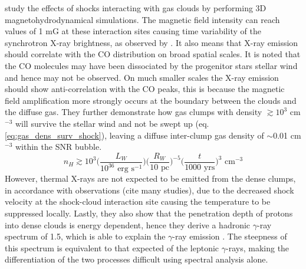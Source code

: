 \documentclass[12pt,a4paper]{article}
\begin{document}
\cite{2012ApJ...744...71I} study the effects of shocks interacting with gas clouds by performing 3D magnetohydrodynamical simulations. The magnetic field intensity can reach values of 1 mG at these interaction sites causing time variability of the synchrotron X-ray brightness, as observed by \cite{2007Natur.449..576U}. It also means that X-ray emission should correlate with the CO distribution on broad spatial scales. It is noted that the CO molecules may have been dissociated by the progenitor stars stellar wind and hence may not be observed. On much smaller scales the X-ray emission should show anti-correlation with the CO peaks, this is because the magnetic field amplification more strongly occurs at the boundary between the clouds and the diffuse gas. They further demonstrate how gas clumps with density $\gtrsim 10^3$ cm$^{-3}$ will survive the stellar wind and not be swept up (eq. \ref{eq:gas_dens_surv_shock}), leaving a diffuse inter-clump gas density of $\sim$0.01 cm$^{-3}$ within the SNR bubble.
\begin{equation} \label{eq:gas_dens_surv_shock}
n_H \gtrsim 10^3  \bigg( \dfrac{L_W}{10^{36} \text{ erg s}^{-1}} \bigg) \bigg( \dfrac{R_W}{10 \text{ pc}} \bigg)^{-5}  \bigg( \dfrac{t}{1000 \text{ yrs}} \bigg)^3 \text{ cm}^{-3}
\end{equation}
However, thermal X-rays are not expected to be emitted from the dense clumps, in accordance with observations (cite many studies), due to the decreased shock velocity at the shock-cloud interaction site causing the temperature to be suppressed locally. Lastly, they also show that the penetration depth of protons into dense clouds is energy dependent, hence they derive a hadronic $\gamma$-ray spectrum of 1.5, which is able to explain the $\gamma$-ray emission \citep{2011ApJ...734...28A}. The steepness of this spectrum is equivalent to that expected of the leptonic $\gamma$-rays, making the differentiation of the two processes difficult using spectral analysis alone. 
\end{document}
